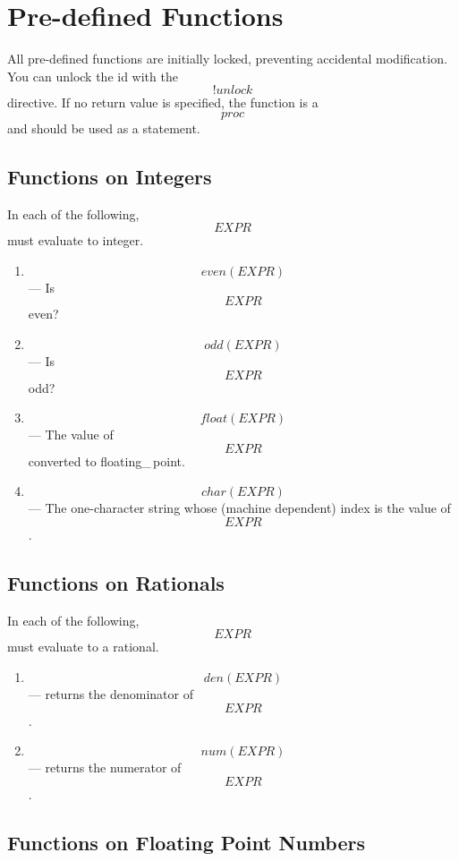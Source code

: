 
\newpage
{\raggedbottom
\section{Pre-defined Functions}\label{predef}

All pre-defined functions are initially locked, preventing accidental
modification.  You can unlock the id with the \[!unlock\] directive.
If no return value is specified, the function is a \[proc\] and should
be used as a statement.

\subsection{Functions on Integers}

In each of the following, \[EXPR\] must evaluate to integer.

\begin{enumerate}
\item
\[even(EXPR)\] --- Is \[EXPR\] even?

\item
\[odd(EXPR)\] --- Is \[EXPR\] odd?

\item
\[float(EXPR)\] ---
The value of \[EXPR\] converted to floating\_\,point.

\item
\[char(EXPR)\] ---  The one-character string
whose (machine dependent) index is
the value of \[EXPR\]\@.
\end{enumerate}


\pagebreak[0]
\subsection{Functions on Rationals}

In each of the following, \[EXPR\] must evaluate to a rational.

\begin{enumerate}
\item
\[den(EXPR)\] --- returns the denominator of \[EXPR\].

\item
\[num(EXPR)\] --- returns the numerator of \[EXPR\].

\end{enumerate}


\pagebreak[0]
\subsection{Functions on Floating Point Numbers}

}
